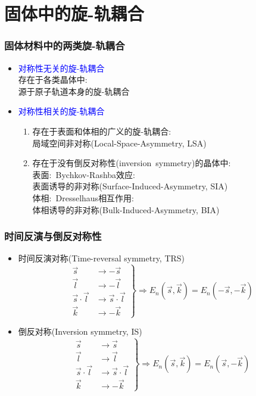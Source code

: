 \section{固体中的旋-轨耦合}
\frame
{
	\frametitle{固体材料中的两类旋-轨耦合}
	\begin{itemize}
		\item \textcolor{blue}{对称性无关的旋-轨耦合}\\
			存在于各类晶体中:\\
			源于原子轨道本身的旋-轨耦合
		\item \textcolor{blue}{对称性相关的旋-轨耦合}\\
			\begin{enumerate}
		\setlength{\itemsep}{5pt}
				\item 存在于表面和体相的广义的旋-轨耦合:\\
					局域空间非对称\textrm{(Local-Space-Asymmetry, LSA)}\\
				\item 存在于没有倒反对称性\textrm{(inversion~symmetry)}的晶体中:\\
			表面:~\textrm{Bychkov-Rashba}效应:\\
			表面诱导的非对称\textrm{(Surface-Induced-Asymmetry, SIA)}\\
			\vskip 4pt
			体相:~\textrm{Dresselhaus}相互作用:\\
			体相诱导的非对称\textrm{(Bulk-Induced-Asymmetry, BIA)}\\
			\end{enumerate}
	\end{itemize}
}

\frame
{
	\frametitle{时间反演与倒反对称性}
	\begin{itemize}
		\item 时间反演对称\textrm{(Time-reversal symmetry, TRS)}\\
			\begin{displaymath}
			\left.
				\begin{aligned}
					\vec s&\rightarrow -\vec s\\
					\vec l&\rightarrow -\vec l\\
					\vec s\cdot\vec l&\rightarrow \vec s\cdot\vec l\\
					\vec k&\rightarrow-\vec k
				\end{aligned}\right\}\Longrightarrow E_n(\vec s,\vec k)=E_n(-\vec s,-\vec k)
			\end{displaymath}
		\item 倒反对称\textrm{(Inversion symmetry, IS)}
			\begin{displaymath}
			\left.
				\begin{aligned}
					\vec s&\rightarrow \vec s\\
					\vec l&\rightarrow \vec l\\
					\vec s\cdot\vec l&\rightarrow \vec s\cdot\vec l\\
					\vec k&\rightarrow-\vec k
				\end{aligned}\right\}\Longrightarrow E_n(\vec s,\vec k)=E_n(\vec s,-\vec k)
			\end{displaymath}
	\end{itemize}
}

